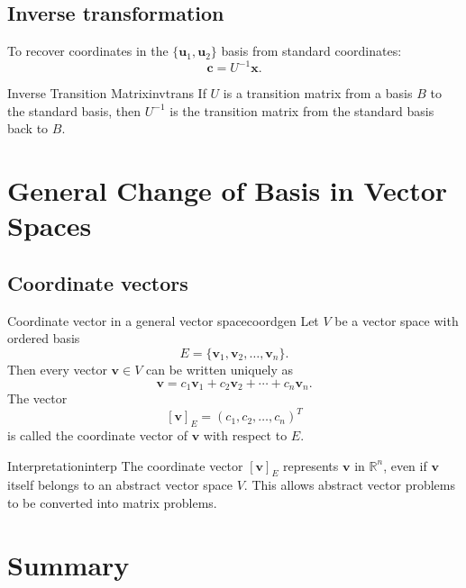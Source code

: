 \documentclass[12pt,a4paper]{article}
\newcommand{\R}{\mathbb{R}}
\newcommand{\vv}[1]{\mathbf{#1}}
\begin{document}
	\subsection{Inverse transformation}
	
	To recover coordinates in the $\{\vv{u}_1,\vv{u}_2\}$ basis from standard coordinates:
	\[
	\vv{c} = U^{-1}\vv{x}.
	\]
	
	\begin{definition}{Inverse Transition Matrix}{invtrans}
		If $U$ is a transition matrix from a basis $B$ to the standard basis, then $U^{-1}$ is the transition matrix from the standard basis back to $B$.
	\end{definition}
	
	\section{General Change of Basis in Vector Spaces}
	
	\subsection{Coordinate vectors}
	
	\begin{definition}{Coordinate vector in a general vector space}{coordgen}
		Let $V$ be a vector space with ordered basis
		\[
		E = \{\vv{v}_1, \vv{v}_2, \dots, \vv{v}_n\}.
		\]
		Then every vector $\vv{v} \in V$ can be written uniquely as
		\[
		\vv{v} = c_1 \vv{v}_1 + c_2 \vv{v}_2 + \cdots + c_n \vv{v}_n.
		\]
		The vector
		\[
		[\vv{v}]_E = (c_1, c_2, \dots, c_n)^T
		\]
		is called the coordinate vector of $\vv{v}$ with respect to $E$.
	\end{definition}
	
	\begin{remark}{Interpretation}{interp}
		The coordinate vector $[\vv{v}]_E$ represents $\vv{v}$ in $\R^n$, even if $\vv{v}$ itself belongs to an abstract vector space $V$. This allows abstract vector problems to be converted into matrix problems.
	\end{remark}
	
	\section{Summary}
	
\end{document}
